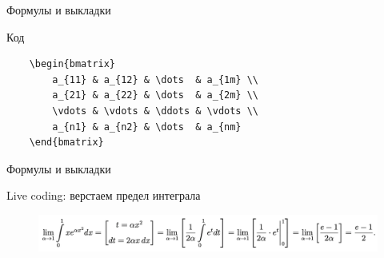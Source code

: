 \begin{frame}[fragile]{Формулы и выкладки}
\begin{onlyenv}
    \vspace{-0.3cm}
    
    \begin{block}{Код}
        \begin{lstlisting}
    \begin{bmatrix}
        a_{11} & a_{12} & \dots  & a_{1m} \\
        a_{21} & a_{22} & \dots  & a_{2m} \\
        \vdots & \vdots & \ddots & \vdots \\
        a_{n1} & a_{n2} & \dots  & a_{nm}
    \end{bmatrix}
        \end{lstlisting}
    \end{block}
\end{onlyenv}

\end{frame}


\begin{frame}[fragile]{Формулы и выкладки}

Live coding: верстаем предел интеграла

\begin{figure}
    \centering
    \includegraphics[width=\textwidth]{images/limit-int.png}
\end{figure}

\end{frame}


